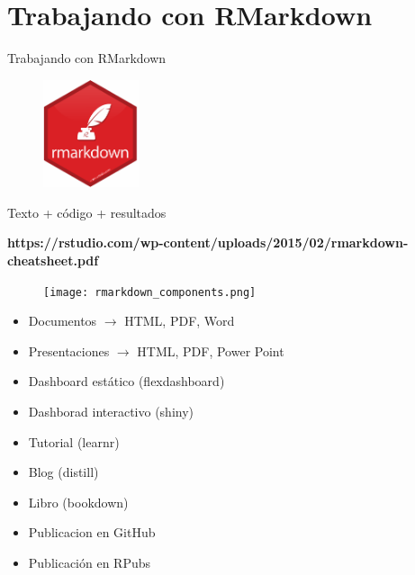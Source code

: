 \documentclass[
  ignorenonframetext,
  aspectratio=169]{beamer}
\begin{document}
\hypertarget{trabajando-con-rmarkdown}{%
\section{Trabajando con RMarkdown}\label{trabajando-con-rmarkdown}}

\begin{frame}{Trabajando con RMarkdown}

\begin{center}

\begin{figure}
\includegraphics[width=0.25\textwidth]{rmarkdown.png}
\end{figure}

Texto + código + resultados

\textbf{https://rstudio.com/wp-content/uploads/2015/02/rmarkdown-cheatsheet.pdf}
\end{center}

\end{frame}

\begin{frame}

\begin{figure}
\texttt{[image: rmarkdown\_components.png]}
\end{figure}

\end{frame}

\begin{frame}

\begin{itemize}
\item
  Documentos \(\rightarrow\) HTML, PDF, Word
\item
  Presentaciones \(\rightarrow\) HTML, PDF, Power Point
\item
  Dashboard estático (flexdashboard)
\item
  Dashborad interactivo (shiny)
\item
  Tutorial (learnr)
\item
  Blog (distill)
\item
  Libro (bookdown)
\item
  Publicacion en GitHub
\item
  Publicación en RPubs
\end{itemize}

\end{frame}
\end{document}
